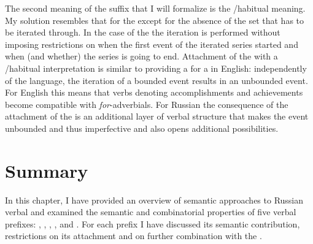 
The second meaning of the  suffix that I will formalize is the /habitual meaning. My solution resembles that for the   except for the absence of the set that has to be iterated through. In the case of the  the iteration is performed without imposing restrictions on when the first event of the iterated series started and when (and whether) the series is going to end. Attachment of the  with a /habitual interpretation is similar to providing a   for a  in English: independently of the language, the iteration of a bounded event results in an unbounded event. For English this means that verbs denoting accomplishments and achievements become compatible with \textit{for}-adverbials. For Russian the consequence of the attachment of the  is an additional layer of verbal structure that makes the event unbounded and thus imperfective and also opens additional  possibilities. 


\section{Summary}
In this chapter, I have provided an overview of semantic approaches to Russian verbal  and examined the semantic and combinatorial properties of five verbal prefixes: , , , , and . For each prefix I have discussed its semantic contribution, restrictions on its attachment and on further combination with the . 

